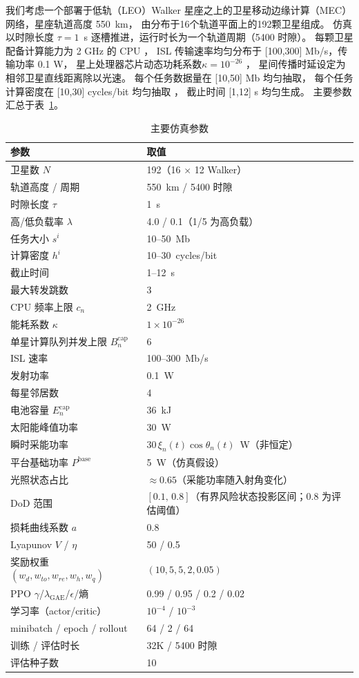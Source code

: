 \documentclass[a4paper,11pt]{article}
\begin{document}
我们考虑一个部署于低轨（LEO）Walker 星座之上的卫星移动边缘计算（MEC）网络，星座轨道高度 550~km，
由分布于16个轨道平面上的192颗卫星组成。
仿真以时隙长度 $\tau=1$~s
逐槽推进，运行时长为一个轨道周期（5400 时隙）。
每颗卫星配备计算能力为 2 GHz 的 CPU \cite{zhang2024mhspo}，
ISL 传输速率均匀分布于 [100,300] Mb/s，传输功率 0.1 W，
星上处理器芯片动态功耗系数$\kappa=10^{-26}$ \cite{zhang2024mhspo}，
星间传播时延设定为相邻卫星直线距离除以光速。
每个任务数据量在 [10,50] Mb 均匀抽取，
每个任务计算密度在 [10,30] cycles/bit 均匀抽取 \cite{zhang2024mhspo}，
截止时间 [1,12] s 均匀生成。
主要参数汇总于表~\ref{tab:sim_params}。


\begin{table}[t]
\centering
\caption{主要仿真参数}
\label{tab:sim_params}
\begin{tabular}{ll}
\hline
参数 & 取值 \\
\hline
卫星数 $N$ & 192（16 $\times$ 12 Walker）\\
轨道高度 / 周期 & 550~km / 5400 时隙 \\
时隙长度 $\tau$ & 1~s \\
高/低负载率 $\lambda$ & 4.0 / 0.1（1/5 为高负载）\\
任务大小 $s^i$ & 10--50~Mb \\
计算密度 $h^i$ & 10--30~cycles/bit~\cite{zhang2024mhspo} \\
截止时间 & 1--12~s \\
最大转发跳数 & 3 \\
CPU 频率上限 $c_n$ & 2~GHz~\cite{zhang2024mhspo} \\
能耗系数 $\kappa$ & $1\times10^{-26}$~\cite{zhang2024mhspo} \\
单星计算队列并发上限 $B^{\mathrm{cap}}_n$ & 6 \\
ISL 速率 & 100--300~Mb/s \\
发射功率 & 0.1~W \\
每星邻居数 & 4 \\
电池容量 $E^{\mathrm{cap}}_n$ & 36~kJ \\
太阳能峰值功率 & 30~W \\
瞬时采能功率 & $30\,\xi_n(t)\cos\theta_n(t)$~W（非恒定）\\
平台基础功率 $P^{\mathrm{base}}$ & 5~W（仿真假设）\\
光照状态占比 & $\approx 0.65$（采能功率随入射角变化）\\
DoD 范围 & $[0.1,\,0.8]$（有界风险状态投影区间；0.8 为评估阈值）\\
损耗曲线系数 $a$ & 0.8 \\
Lyapunov $V$ / $\eta$ & 50 / 0.5 \\
奖励权重 $(w_d,w_{to},w_{re},w_h,w_q)$ & $(10,5,5,2,0.05)$ \\
PPO $\gamma$/$\lambda_{\text{GAE}}$/$\epsilon$/熵 & 0.99 / 0.95 / 0.2 / 0.02 \\
学习率（actor/critic） & $10^{-4}$ / $10^{-3}$ \\
minibatch / epoch / rollout & 64 / 2 / 64 \\
训练 / 评估时长 & 32K / 5400 时隙 \\
评估种子数 & 10 \\
\hline
\end{tabular}
\end{table}
\end{document}
